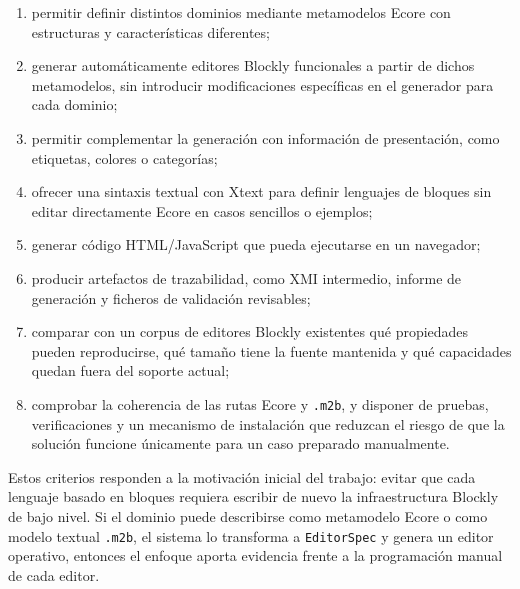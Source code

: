 \begin{enumerate}
  \item permitir definir distintos dominios mediante metamodelos Ecore con
  estructuras y características diferentes;
  \item generar automáticamente editores Blockly funcionales a partir de dichos
  metamodelos, sin introducir modificaciones específicas en el generador para
  cada dominio;
  \item permitir complementar la generación con información de presentación,
  como etiquetas, colores o categorías;
  \item ofrecer una sintaxis textual con Xtext para definir lenguajes de bloques
  sin editar directamente Ecore en casos sencillos o ejemplos;
	  \item generar código HTML/JavaScript que pueda ejecutarse en un navegador;
	  \item producir artefactos de trazabilidad, como XMI intermedio, informe de
	  generación y ficheros de validación revisables;
	  \item comparar con un corpus de editores Blockly existentes qué propiedades
	  pueden reproducirse, qué tamaño tiene la fuente mantenida y qué capacidades
	  quedan fuera del soporte actual;
	  \item comprobar la coherencia de las rutas Ecore y \texttt{.m2b}, y disponer
	  de pruebas, verificaciones y un mecanismo de instalación que reduzcan el
	  riesgo de que la solución funcione únicamente para un caso preparado
	  manualmente.
\end{enumerate}

Estos criterios responden a la motivación inicial del trabajo: evitar que cada
lenguaje basado en bloques requiera escribir de nuevo la infraestructura Blockly
de bajo nivel. Si el dominio puede describirse como metamodelo Ecore o como
modelo textual \texttt{.m2b}, el sistema lo transforma a \texttt{EditorSpec} y
genera un editor operativo, entonces el enfoque aporta evidencia frente a la
programación manual de cada editor.
